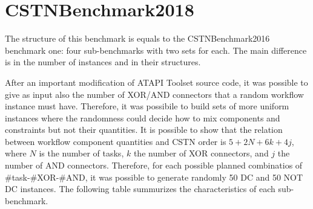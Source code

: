 \documentclass[a4paper,11pt]{article}
\begin{document}
\section{CSTNBenchmark2018}

The structure of this benchmark is equals to the CSTNBenchmark2016 benchmark one: four sub-benchmarks with two sets for each. 
The main difference is in the number of instances and in their structures.

After an important modification of ATAPI Toolset source code, it was possible to give as input also the number of XOR\slash AND connectors that a random workflow instance must have.
Therefore, it was possibile to build sets of more uniform instances where the randomness could decide how to mix components and constraints but not their quantities.
It is possible to show that the relation between workflow component quantities and CSTN order is $5+2N+6k+4j$, where $N$ is the number of tasks, $k$ the number of XOR connectors, and $j$ the number of AND connectors. 
Therefore, for each possible planned combinatios of \#task-\#XOR-\#AND, it was possible to generate randomly 50 DC and 50 NOT DC instances.
The following table summurizes the characteristics of each sub-benchmark.
\end{document}
